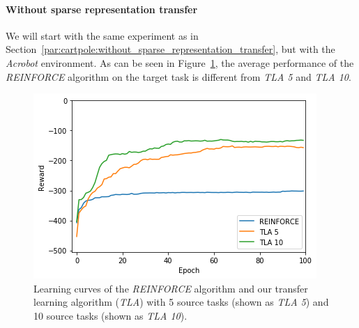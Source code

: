 \paragraph{Without sparse representation transfer} %
\label{par:acrobot:without_sparse_representation_transfer}
We will start with the same experiment as in Section~\ref{par:cartpole:without_sparse_representation_transfer}, but with the \textit{Acrobot} environment.
As can be seen in Figure~\ref{fig:Acrobot:reward_target_re-akt5-akt10}, the average performance of  the \textit{REINFORCE} algorithm on the target task is different from \textit{TLA 5} and \textit{TLA 10}.
\begin{figure}[H]
    \centering
    \includegraphics[width=.8\linewidth]{images/results/Acrobot/no_sparse_transfer/reward_target_re-akt5-akt10.png}
    \caption[Learning curves for the \textit{Acrobot} environment of \textit{REINFORCE} and \textit{TLA} for the \emph{Acrobot} environment]{Learning curves of the \textit{REINFORCE} algorithm and our transfer learning algorithm (\textit{TLA}) with 5 source tasks (shown as \textit{TLA 5}) and 10 source tasks (shown as \textit{TLA 10}).}
    \label{fig:Acrobot:reward_target_re-akt5-akt10}
\end{figure}

